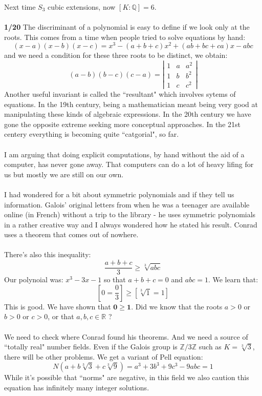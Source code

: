 \documentclass[12pt]{article}
\begin{document}
\noindent Next time $S_3$ cubic extensions, now $[K:\mathbb{Q}]= 6$. \\ \\
\textbf{1/20} The discriminant of a polynomial is easy to define if we look only at the roots.  This comes from a time when people tried to solve equations by hand:
$$  (x- a)(x - b)(x-c)
= x^3 - (a+b+c)x^2 + (ab+bc+ca)x - abc$$
and we need a condition for these three roots to be distinct, we obtain:
$$ (a-b)(b-c)(c-a) = \left|
\begin{array}{ccc} 
1 & a & a^2 \\
1 & b & b^2 \\
1 & c & c^2 \end{array} \right| $$
Another useful invariant is called the ``resultant" which involves sytems of equations.  In the 19th century, being a mathematician meant being very good at manipulating these kinds of algebraic expressions.  In the 20th century we have gone the opposite extreme seeking more conceptual approaches.  In the 21st centery everything is becoming quite ``catgorial", so far. \\ \\
I am arguing that doing explicit computations, by hand without the aid of a computer, has never gone away.  That computers can do a lot of heavy lifing for us but mostly we are still on our own. \\ \\
I had wondered for a bit about symmetric polynomials and if they tell us information.  Galois' original letters from when he was a teenager are available online (in French) without a trip to the library - he uses symmetric polynomials in a rather creative way and I always wondered how he stated his result. Conrad uses a theorem  that comes out of nowhere. \\ \\
There's also this inequality:
$$  \frac{a+b+c}{3} \geq \sqrt[3]{abc} $$
Our polynoial was: $x^3 - 3x - 1 $ so that $a+b+c = 0$ and $abc = 1$.  We learn that:
$$ \left[ 0= \frac{0}{3} \right] \geq \left[ \sqrt[3]{1} = 1 \right] $$
This is good.  We have shown that $\mathbf{0 \geq 1}$. Did we know that the roots $a> 0$ or $b > 0$ or $c > 0$, or that $a,b,c \in \mathbb{R}$ ? \\  \\
We need to check where Conrad found his theorems. And we need a source of ``totally real" number fields.  Even if the Galois group is $\mathbb{Z}/3\mathbb{Z}$ such as $K = \sqrt[3]{3}$, there will be other problems.  We get a variant of Pell equation:
$$ N(a + b\sqrt[3]{3} + c\sqrt[3]{9})
= a^3 + 3b^3 + 9 c^3 - 9abc = 1 $$
While it's possible that ``norms" are negative, in this field we also caution this equation has infinitely many integer solutions.

\vfill
\end{document}
